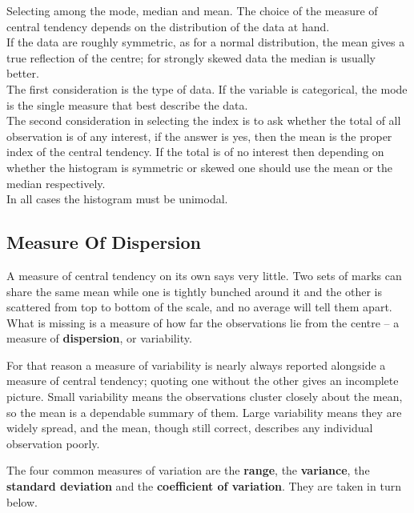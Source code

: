 \documentclass[11pt,a4paper]{article}
\theoremstyle{definition}
\begin{document}
Selecting among the mode, median and mean. The choice of the measure of central tendency depends on the distribution of the data at hand.\\ If the data are roughly symmetric, as for a normal distribution, the mean gives a true reflection of the centre; for strongly skewed data the median is usually better.\\[1ex]


The first consideration is the type of data. If the variable is categorical, the mode is the single measure that best describe the data.\\ The second consideration in selecting the index is to ask whether the total of all observation is of any interest, if the answer is yes, then the mean is the proper index of the central tendency. If the total is of no interest then depending on whether the histogram is symmetric or skewed one should use the mean or the median respectively.\\ In all cases the histogram must be unimodal.\\

\subsection{Measure Of Dispersion}

A measure of central tendency on its own says very little. Two sets of marks can share the
same mean while one is tightly bunched around it and the other is scattered from top to
bottom of the scale, and no average will tell them apart. What is missing is a measure of
how far the observations lie from the centre -- a measure of \textbf{dispersion}, or
variability.

For that reason a measure of variability is nearly always reported alongside a measure of
central tendency; quoting one without the other gives an incomplete picture. Small
variability means the observations cluster closely about the mean, so the mean is a
dependable summary of them. Large variability means they are widely spread, and the mean,
though still correct, describes any individual observation poorly.

The four common measures of variation are the \textbf{range}, the \textbf{variance}, the
\textbf{standard deviation} and the \textbf{coefficient of variation}. They are taken in
turn below.
\end{document}
